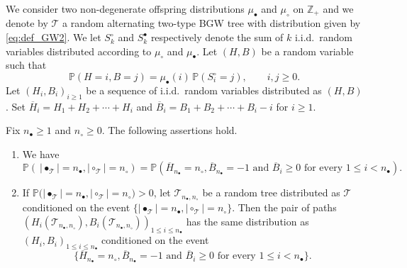 \documentclass[AHL,XML,longabstracts,Unicode]{cedram}
\providecommand{\abs}[1]{\lvert#1\rvert}
\newcommand{\Z}{\mathbb{Z}}
\def\mub{\mu_{\bullet}}
\def\muc{\mu_{\circ}}
\def\nc{n_{\circ}}
\def\nb{n_{\bullet}}
\def\oB{\overline{B}}
\def\oH{\overline{H}}
\def\Ts{\mathscr{T}}
\renewcommand\Pr[1]{\mathbb{P}\left(#1\right)}
\newcommand\Prb[1]{\mathbb{P}\big(#1\big)}
\begin{document}
 We consider two non-degenerate offspring distributions $\mub$ and $\muc$ on $\Z_{+}$ and we denote by $\Ts$ a random alternating two-type BGW tree with distribution given by \eqref{eq:def_GW2}. We let $S^{\circ}_{k}$ and $S^{\bullet}_{k}$ respectively denote the sum of $k$ i.i.d.\ random variables distributed according to $\muc$ and $\mub$.
 Let $(H,B)$ be a random variable such that
 \begin{equation}
    \Pr{H=i,B=j}=\mub(i) \, \Pr{S^{\circ}_{i}=j}, \qquad  i, j \geq 0.
    \label{eq:HB}
  \end{equation}
Let $(H_{i},B_{i})_{i \geq 1}$ be a sequence of i.i.d.\ random variables distributed as $(H,B)$. Set $\oH_{i}=H_{1}+H_{2}+ \cdots+H_{i}$ and  $\oB_{i}=B_{1}+B_{2}+ \cdots+B_{i}-i$ for $i \geq 1$.

\begin{lemma}\label{lem:codeRW} Fix $\nb \geq 1$ and $\nc \geq 0$. The following assertions hold.
\begin{enumerate}
\item[(i)]We have \[\Pr{\ \abs{\bullet_{\Ts}} =\nb,\abs{\circ_{\Ts}}=\nc}=\Pr{\oH_{\nb}=\nc,\oB_{\nb}=-1 \textrm{ and } \oB_{i} \geq 0 \textrm{ for every } 1 \leq i < \nb}.\]
\item[(ii)] If $\Prb{ \abs{\bullet_{\Ts}} =\nb,\abs{\circ_{\Ts}}=\nc}>0$, let $\Ts_{\nb,\nc}$ be a random tree distributed as $\Ts$ conditioned on the event $\{ \abs{\bullet_{\Ts}} =\nb,\abs{\circ_{\Ts}}=\nc \}$. Then the pair of paths $(H_{i}(\Ts_{\nb,\nc}) ,B_{i}(\Ts_{\nb,\nc}))_{1 \leq i \leq \nb}$ has the same distribution as $(H_{i},B_{i})_{1 \leq i \leq \nb}$ conditioned on the event
  \[\{\oH_{\nb}=\nc,\oB_{\nb}=-1 \textrm{ and } \oB_{i} \geq 0 \textrm{ for every } 1 \leq i < \nb\}.\]
\end{enumerate}
\end{lemma}
\end{document}
